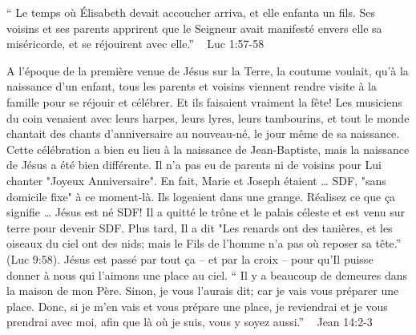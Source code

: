 

“ Le temps où Élisabeth devait accoucher arriva, et elle enfanta un fils. Ses voisins et ses parents apprirent que le Seigneur avait manifesté envers elle sa miséricorde, et se réjouirent avec elle.” ~ Luc 1:57-58

        A l'époque de la première venue de Jésus sur la Terre, la coutume voulait, qu'à la naissance d'un enfant, tous les parents et voisins viennent rendre visite à la famille pour se réjouir et célébrer. Et ils faisaient vraiment la fête! Les musiciens du coin venaient avec leurs harpes, leurs lyres, leurs tambourins, et tout le monde chantait des chants d'anniversaire au nouveau-né, le jour même de sa naissance.
        Cette célébration a bien eu lieu à la naissance de Jean-Baptiste, mais la naissance de Jésus a été bien différente. Il n'a pas eu de parents ni de voisins pour Lui chanter "Joyeux Anniversaire". En fait, Marie et Joseph étaient … SDF, "sans domicile fixe" à ce moment-là. Ils logeaient dans une grange.
        Réalisez ce que ça signifie … Jésus est né SDF! Il a quitté le trône et le palais céleste et est venu sur terre pour devenir SDF. Plus tard, Il a dit "Les renards ont des tanières, et les oiseaux du ciel ont des nids; mais le Fils de l’homme n’a pas où reposer sa tête.” (Luc 9:58). Jésus est passé par tout ça – et par la croix – pour qu'Il puisse donner à nous qui l'aimons une place au ciel.
        “ Il y a beaucoup de demeures dans la maison de mon Père. Sinon, je vous l’aurais dit; car je vais vous préparer une place. Donc, si je m’en vais et vous prépare une place, je reviendrai et je vous prendrai avec moi, afin que là où je suis, vous y soyez aussi.” ~ Jean 14:2-3
